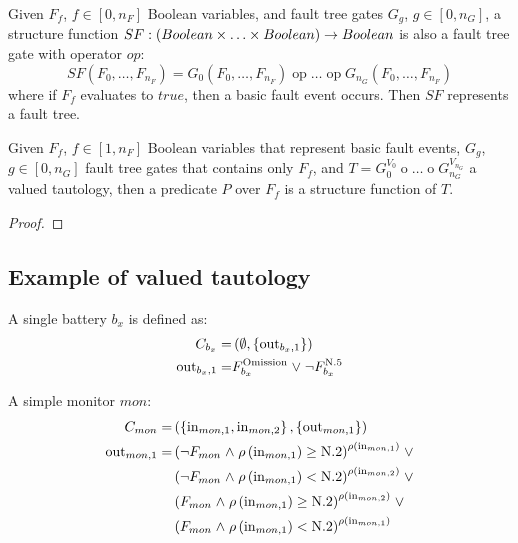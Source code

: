 \begin{definition}
\begin{sloppypar}
Given $F_f$, $f \in [0,n_F]$ Boolean variables, and fault tree gates $G_g$, $g \in [0, n_G]$, a structure function $SF:\left(Boolean \times \ldots \times Boolean\right) \rightarrow Boolean $ is also a fault tree gate with operator $op$:
\[
SF\left(F_0, \ldots, F_{n_F}\right) = G_0\left(F_0, \ldots, F_{n_F}\right) \mathop{op} \ldots \mathop{op} G_{n_G}\left(F_0, \ldots, F_{n_F}\right)
\]
%
where if $F_f$ evaluates to $true$, then a basic fault event occurs.
% 
Then $SF$ represents a fault tree.
\end{sloppypar} 
\end{definition}

\begin{theorem}
\label{thr:predicate-fault-tree}
Given $F_f$, $f \in [1,n_F]$ Boolean variables that represent basic fault events, $G_g$, $g \in [0,n_G]$ fault tree gates that contains only $F_f$, and $T = G_0^{V_0} \mathop{op_0} \ldots \mathop{op_{n_G}} G_{n_G}^{V_{n_G}}$ a valued tautology, then a predicate $P$ over $F_f$ is a structure function of $T$.
\end{theorem}
\begin{proof}
\end{proof}

\subsection{Example of valued tautology}
%
A single battery $b_x$ is defined as:
\begin{align*}
C_{b_x} = & \left( \emptyset, \left\{\mathrm{out}_{b_x,1}\right\} \right) \\
\mathrm{out}_{b_x,1} = & F_{b_x}^{\mathrm{Omission}} \mathrel{\vee} \neg F_{b_x}^{\mathrm{N}.5}
\end{align*}

A simple monitor $mon$:
\begin{align*}
C_{mon} = &  \left( 
    \left\{\mathrm{in}_{mon,1}, \mathrm{in}_{mon,2}\right\}, 
    \left\{\mathrm{out}_{mon,1}\right\} 
  \right) \\
\mathrm{out}_{mon,1} = 
  &\left( 
    \neg F_{mon} \mathrel{\wedge} \rho\left(\mathrm{in}_{mon,1}\right) \geq \mathrm{N}.2
  \right)^{\rho\left(\mathrm{in}_{mon,1}\right)} \mathrel{\vee} \\
  & \left(
    \neg F_{mon} \mathrel{\wedge} \rho\left(\mathrm{in}_{mon,1}\right) < \mathrm{N}.2
  \right)^{\rho\left(\mathrm{in}_{mon,2}\right) } \mathrel{\vee} \\
  & \left(
    F_{mon} \mathrel{\wedge} \rho\left(\mathrm{in}_{mon,1}\right) \geq \mathrm{N}.2
  \right)^{\rho\left(\mathrm{in}_{mon,2}\right)} \mathrel{\vee} \\
  & \left(
    F_{mon} \mathrel{\wedge} \rho\left(\mathrm{in}_{mon,1}\right) < \mathrm{N}.2
  \right)^{\rho\left(\mathrm{in}_{mon,1}\right)}
\end{align*}

